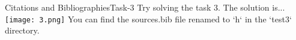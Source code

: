 \begin{frame}{Citations and Bibliographies}{Task-3}
Try solving the task 3. The solution is...\\ \pause
\vspace{1em}
\texttt{[image: 3.png]}
You can find the sources.bib file renamed to `h` in the `test3`
directory.
\end{frame}
